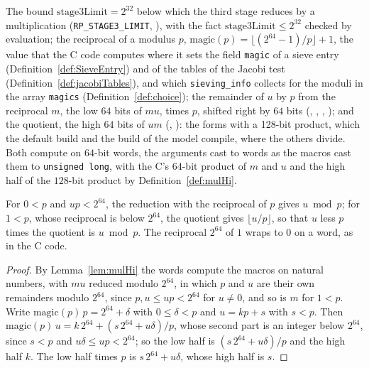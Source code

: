 \begin{definition}\label{def:mulMod}
  \leanok
  The bound $\mathrm{stage3Limit} = 2^{32}$ below which the third stage reduces by a multiplication
  (\verb|RP_STAGE3_LIMIT|, ), with the fact
  $\mathrm{stage3Limit} \le 2^{32}$ checked by evaluation; the reciprocal of a modulus $p$,
  $\mathrm{magic}(p) = \lfloor (2^{64} - 1) / p \rfloor + 1$, the value that the C code computes
  where it sets the field \verb|magic| of a sieve entry (Definition~\ref{def:SieveEntry}) and of the
  tables of the Jacobi test (Definition~\ref{def:jacobiTables}), and which \verb|sieving_info|
  collects for the moduli in the array \verb|magics| (Definition~\ref{def:choice}); the
  remainder of $u$ by $p$ from the reciprocal $m$, the low $64$ bits of $m u$, times $p$, shifted
  right by $64$ bits (, ,
  , ); and the quotient, the high
  $64$ bits of $u m$ (, ): the
  forms with a 128-bit product, which the default build and the build of the model compile, where
  the others divide. Both compute on $64$-bit words, the arguments cast to words as the macros cast
  them to \verb|unsigned long|, with the C's $64$-bit product of $m$ and $u$ and the high half of
  the $128$-bit product by Definition~\ref{def:mulHi}.
\end{definition}

\begin{lemma}\label{lem:mulMod}
  \leanok
  For $0 < p$ and $u p < 2^{64}$, the reduction with the reciprocal of $p$ gives $u \bmod p$; for
  $1 < p$, whose reciprocal is below $2^{64}$, the quotient gives $\lfloor u / p \rfloor$, so that
  $u$ less $p$ times the quotient is $u \bmod p$. The reciprocal $2^{64}$ of $1$ wraps to $0$ on a
  word, as in the C code.
\end{lemma}

\begin{proof}
  \leanok
  By Lemma~\ref{lem:mulHi} the words compute the macros on natural numbers, with $m u$ reduced
  modulo $2^{64}$, in which $p$ and $u$ are their own remainders modulo $2^{64}$, since
  $p, u \le u p < 2^{64}$ for $u \ne 0$, and so is $m$ for $1 < p$. Write
  $\mathrm{magic}(p)\, p = 2^{64} + \delta$ with $0 \le \delta < p$ and $u = k p + s$ with $s < p$.
  Then $\mathrm{magic}(p)\, u = k\, 2^{64} + (s\, 2^{64} + u \delta) / p$, whose second part is an
  integer below $2^{64}$, since $s < p$ and $u \delta \le u p < 2^{64}$; so the low half is
  $(s\, 2^{64} + u \delta)/p$ and the high half $k$. The low half times $p$ is
  $s\, 2^{64} + u \delta$, whose high half is $s$.
\end{proof}

